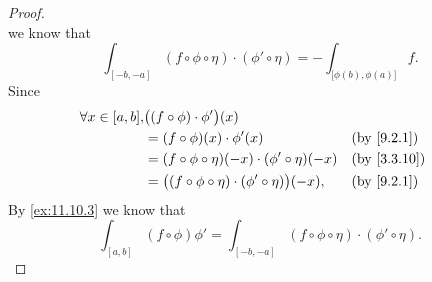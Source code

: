 \begin{proof}
\[  \]
  we know that
  \[
    \int_{[-b, -a]} (f \circ \phi \circ \eta) \cdot (\phi' \circ \eta) = -\int_{\big[\phi(b), \phi(a)\big]} f.
  \]
  Since
  \begin{align*}
    \forall x \in [a, b], & \big((f \circ \phi) \cdot \phi'\big)(x)                                              \\
                          & = (f \circ \phi)(x) \cdot \phi'(x)                                  &  & \by{9.2.1}  \\
                          & = (f \circ \phi \circ \eta)(-x) \cdot (\phi' \circ \eta)(-x)        &  & \by{3.3.10} \\
                          & = \big((f \circ \phi \circ \eta) \cdot (\phi' \circ \eta)\big)(-x), &  & \by{9.2.1}
  \end{align*}
  By \cref{ex:11.10.3} we know that
  \[
    \int_{[a, b]} (f \circ \phi) \phi' = \int_{[-b, -a]} (f \circ \phi \circ \eta) \cdot (\phi' \circ \eta).
  \]
\end{proof}
